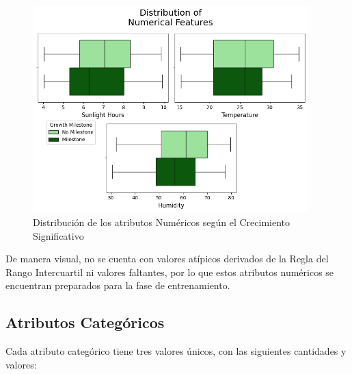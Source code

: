 \documentclass[12pt,a4paper]{article}
\begin{document}
{{            \begin{figure}[hbtp]
                \centering
                \includegraphics[width=0.95\textwidth]{./Resources/3_1.png}
                \caption{Distribución de los atributos Numéricos según el Crecimiento Significativo}
                \label{fig:dist_num}
            \end{figure}

            De manera visual, no se cuenta con valores atípicos derivados de la Regla del 
            Rango Intercuartil ni valores faltantes, por lo que estos atributos numéricos se 
            encuentran preparados para la fase de entrenamiento.
        }

        \subsection{Atributos Categóricos}
        {
            Cada atributo categórico tiene tres valores únicos, con las siguientes cantidades 
            y valores:\\
                
}}
\end{document}
